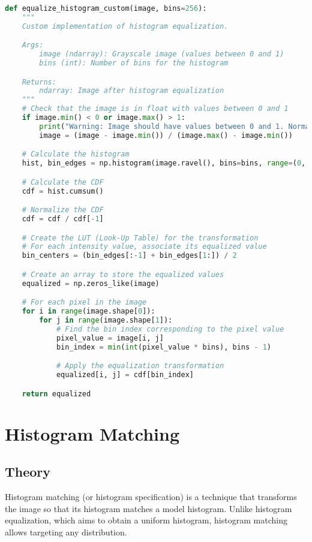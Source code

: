 \documentclass[12pt,a4paper]{article}
\begin{document}
\begin{lstlisting}[language=Python, caption=Histogram equalization implementation]
def equalize_histogram_custom(image, bins=256):
    """
    Custom implementation of histogram equalization.

    Args:
        image (ndarray): Grayscale image (values between 0 and 1)
        bins (int): Number of bins for the histogram

    Returns:
        ndarray: Image after histogram equalization
    """
    # Check that the image is in float with values between 0 and 1
    if image.min() < 0 or image.max() > 1:
        print("Warning: Image should have values between 0 and 1. Normalization applied.")
        image = (image - image.min()) / (image.max() - image.min())

    # Calculate the histogram
    hist, bin_edges = np.histogram(image.ravel(), bins=bins, range=(0, 1))

    # Calculate the CDF
    cdf = hist.cumsum()

    # Normalize the CDF
    cdf = cdf / cdf[-1]

    # Create the LUT (Look-Up Table) for the transformation
    # For each intensity value, associate its equalized value
    bin_centers = (bin_edges[:-1] + bin_edges[1:]) / 2

    # Create an array to store the equalized values
    equalized = np.zeros_like(image)

    # For each pixel in the image
    for i in range(image.shape[0]):
        for j in range(image.shape[1]):
            # Find the bin index corresponding to the pixel value
            pixel_value = image[i, j]
            bin_index = min(int(pixel_value * bins), bins - 1)

            # Apply the equalization transformation
            equalized[i, j] = cdf[bin_index]

    return equalized
\end{lstlisting}

\section{Histogram Matching}

\subsection{Theory}

Histogram matching (or histogram specification) is a technique that transforms the image so that its histogram matches a model histogram. Unlike histogram equalization, which aims to obtain a uniform histogram, histogram matching allows targeting any distribution.
\end{document}
